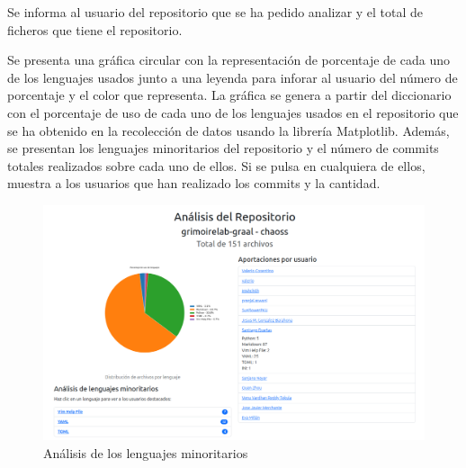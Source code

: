 \documentclass[a4paper, 12pt]{book}
\begin{document}
Se informa al usuario del repositorio que se ha pedido analizar y el total de ficheros que tiene el repositorio.

Se presenta una gráfica circular con la representación de porcentaje de cada uno de los lenguajes usados junto a una leyenda para inforar al usuario del número de porcentaje y el color que representa. La gráfica se genera a partir del diccionario con el porcentaje de uso de cada uno de los lenguajes usados en el repositorio que se ha obtenido en la recolección de datos usando la librería Matplotlib. Además, se presentan los lenguajes minoritarios del repositorio y el número de commits totales realizados sobre cada uno de ellos. Si se pulsa en cualquiera de ellos, muestra a los usuarios que han realizado los commits y la cantidad.

\begin{figure}[H]
  \centering
  \includegraphics[width=1\textwidth]{img/resultado2userrepo.png}
  \caption{Análisis de los lenguajes minoritarios}
  \label{figura:resultuserrepo2}
\end{figure}
\end{document}
